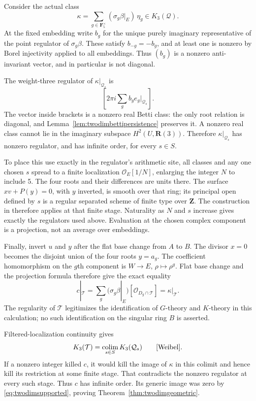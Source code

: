 \documentclass[11pt,a4paper]{article}
\theoremstyle{remark}
\newcommand{\Z}{\mathbf Z}
\newcommand{\R}{\mathbf R}
\newcommand{\F}{\mathbf F}
\newcommand{\OO}{\mathcal O}
\begin{document}
Consider the actual class
\begin{equation}\label{eq:twodimkappa}
 \kappa=\sum_{g\in\F_5^\times}
             (\sigma_g\beta|_E)\,\eta_g\in K_3(\mathcal Q).
\end{equation}
At the fixed embedding write $b_g$ for the unique purely imaginary
representative of the point regulator of $\sigma_g\beta$.
These satisfy $b_{-g}=-b_g$, and at least one is nonzero by Borel
injectivity applied to all embeddings. Thus $(b_g)$ is a nonzero
anti-invariant vector, and in particular is not diagonal.

The weight-three regulator of $\kappa|_{\mathcal Q_s}$ is
\[
 \left[2\pi i\sum_g b_g e_g|_{\mathcal Q_s}\right].
\]
The vector inside brackets is a nonzero real Betti class: the only
root relation is diagonal, and
Lemma~\ref{lem:twodimbettipersistence} preserves it. A nonzero real
class cannot lie in the imaginary subspace $H^2(U,\R(3))$.
Therefore $\kappa|_{\mathcal Q_s}$ has nonzero regulator, and has
infinite order, for every $s\in S$.

To place this use exactly in the regulator's arithmetic site, all
classes and any one chosen $s$ spread to a finite localization
$\OO_E[1/N]$, enlarging the integer $N$ to include 5. The four roots
and their differences are units there. The surface
$xv+P(y)=0$, with $y$ inverted, is smooth over that ring; its
principal open defined by $s$ is a regular separated scheme of finite
type over $\Z$. The construction in \cite{BunkeTamme} therefore
applies at that finite stage. Naturality as $N$ and $s$ increase
gives exactly the regulators used above. Evaluation at the chosen
complex component is a projection, not an average over embeddings.

Finally, invert $u$ and $y$ after the flat base change from $A$ to
$B$. The divisor $x=0$ becomes the disjoint union of the four roots
$y=a_g$. The coefficient homomorphism on the $g$th component is
$W\to E$, $\rho\mapsto\rho^g$. Flat base change and the projection
formula therefore give the exact equality
\[
 c|_{\mathcal T}
   =\sum_g (\sigma_g\beta|_E)
                       [\OO_{D_g\cap\mathcal T}]
   =\kappa|_{\mathcal T}.
\]
The regularity of $\mathcal T$ legitimizes the identification of
$G$-theory and $K$-theory in this calculation; no such identification
on the singular ring $B$ is asserted.

Filtered-localization continuity gives
\[
 K_3(\mathcal T)=\mathop{\mathrm{colim}}_{s\in S}K_3(\mathcal Q_s)
 \qquad\cite[Chapter~IV, Section~6.4]{Weibel}.
\]
If a nonzero integer killed $c$, it would kill the image of $\kappa$
in this colimit and hence kill its restriction at some finite stage.
That contradicts the nonzero regulator at every such stage. Thus $c$
has infinite order. Its generic image was zero by
\eqref{eq:twodimsupported}, proving
Theorem~\ref{thm:twodimgeometric}.
\end{document}

